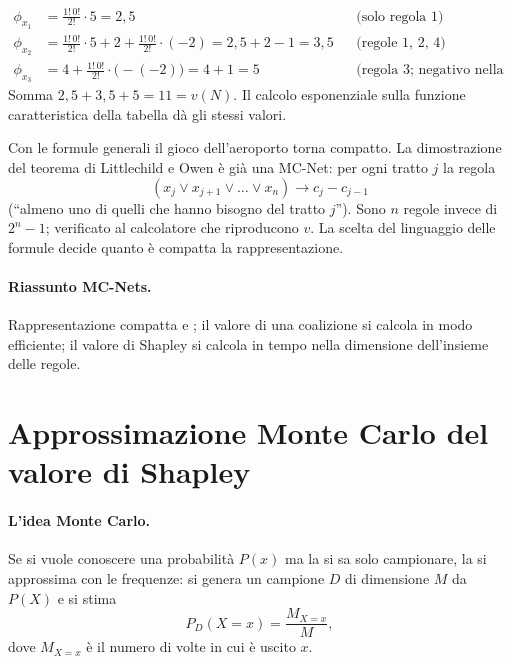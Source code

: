 \begin{esempio}
\[
\begin{aligned}
  \phi_{x_1} &= \tfrac{1!\,0!}{2!}\cdot 5 = 2{,}5
    &&\text{(solo regola 1)}\\
  \phi_{x_2} &= \tfrac{1!\,0!}{2!}\cdot 5 + 2 + \tfrac{1!\,0!}{2!}\cdot(-2)
    = 2{,}5 + 2 - 1 = 3{,}5 &&\text{(regole 1, 2, 4)}\\
  \phi_{x_3} &= 4 + \tfrac{1!\,0!}{2!}\cdot\bigl(-(-2)\bigr) = 4 + 1 = 5
    &&\text{(regola 3; negativo nella 4)}
\end{aligned}
\]
Somma $2{,}5 + 3{,}5 + 5 = 11 = v(N)$. Il calcolo esponenziale sulla funzione
caratteristica della tabella dà gli stessi valori.
\end{esempio}

\begin{extra}
Con le formule generali il gioco dell'aeroporto torna compatto. La dimostrazione del
teorema di Littlechild e Owen è già una MC-Net: per ogni tratto $j$ la regola
\[
  (x_j \lor x_{j+1} \lor \dots \lor x_n) \to c_j - c_{j-1}
\]
(``almeno uno di quelli che hanno bisogno del tratto $j$''). Sono $n$ regole invece di
$2^n - 1$; verificato al calcolatore che riproducono $v$. La scelta del linguaggio delle
formule decide quanto è compatta la rappresentazione.
\end{extra}

\paragraph{Riassunto MC-Nets.}
Rappresentazione compatta e ; il valore di una coalizione si calcola in modo
efficiente; il valore di Shapley si calcola in tempo  nella dimensione
dell'insieme delle regole.

\section{Approssimazione Monte Carlo del valore di Shapley}

\paragraph{L'idea Monte Carlo.}
Se si vuole conoscere una probabilità $P(x)$ ma la si sa solo campionare, la si approssima
con le frequenze: si genera un campione $D$ di dimensione $M$ da $P(X)$ e si stima
\[
  P_D(X = x) = \frac{M_{X=x}}{M},
\]
dove $M_{X=x}$ è il numero di volte in cui è uscito $x$.

